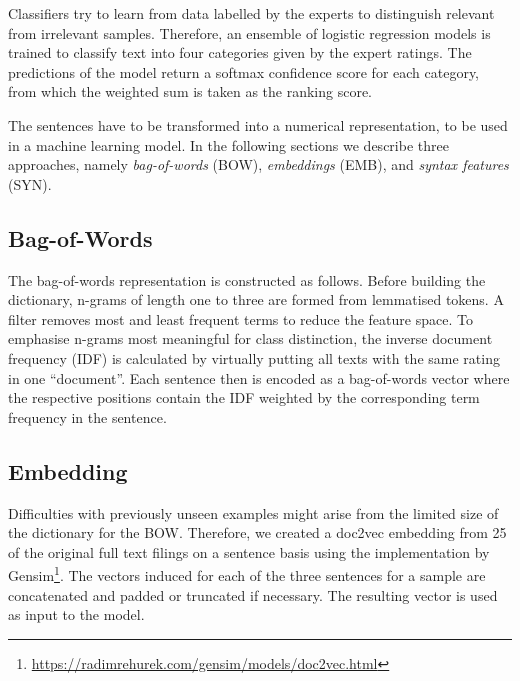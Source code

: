 Classifiers try to learn from data labelled by the experts to distinguish relevant from irrelevant samples.
Therefore, an ensemble of logistic regression models is trained to classify text into four categories given by the expert ratings.
The predictions of the model return a softmax confidence score for each category, from which the weighted sum is taken as the ranking score.


The sentences have to be transformed into a numerical representation, to be used in a machine learning model.
In the following sections we describe three approaches, namely \textit{bag-of-words} (BOW), \textit{embeddings} (EMB), and \textit{syntax features} (SYN).


\subsection{Bag-of-Words}
The bag-of-words representation is constructed as follows. 
Before building the dictionary, n-grams of length one to three are formed from lemmatised tokens. 
A filter removes most and least frequent terms to reduce the feature space. To emphasise n-grams most meaningful for class distinction, the inverse document frequency (IDF) is calculated by virtually putting all texts with the same rating in one ``document''. 
Each sentence then is encoded as a bag-of-words vector where the respective positions contain the IDF weighted by the corresponding term frequency in the sentence.

\subsection{Embedding}
Difficulties with previously unseen examples might arise from the limited size of the dictionary for the BOW.
Therefore, we created a doc2vec embedding from 25 of the original full text filings on a sentence basis using the implementation by Gensim\footnote{\url{https://radimrehurek.com/gensim/models/doc2vec.html}}.
The vectors induced for each of the three sentences for a sample are concatenated and padded or truncated if necessary.
The resulting vector is used as input to the model.

